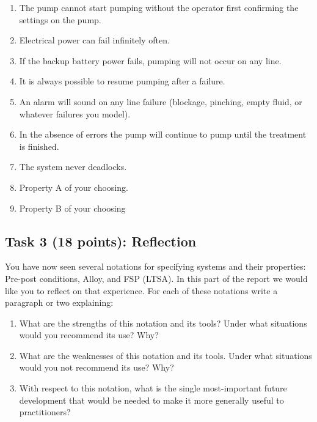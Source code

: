 \documentclass{article}
\newcommand{\head}{\subsection*}
\begin{document}
\begin{enumerate}
    \item The pump cannot start pumping without the operator first confirming the settings on the pump.
    \item Electrical power can fail infinitely often.
    \item If the backup battery power fails, pumping will not occur on any line.
    \item It is always possible to resume pumping after a failure.
    \item An alarm will sound on any line failure (blockage, pinching, empty fluid, or whatever failures you model).
    \item In the absence of errors the pump will continue to pump until the treatment is finished.
    \item The system never deadlocks.
    \item Property A of your choosing.
    \item Property B of your choosing
\end{enumerate}

\head{Task 3 (18 points): Reflection}

 You have now seen several notations for specifying systems and their properties: Pre-post conditions,
 Alloy, and FSP (LTSA).  In this part of the report we would like you to reflect on that experience.
 For each of these notations write a paragraph or two explaining:
\begin{enumerate}
 \item What are the strengths of this notation and its tools?  Under what situations would you
recommend its use? Why?
 \item What are the weaknesses of this notation and its tools. Under what
situations would you not recommend its use? Why?
 \item With respect to this notation, what is
the single most-important future development that would be needed to make it more generally useful
to practitioners?

\end{enumerate}
\end{document}
